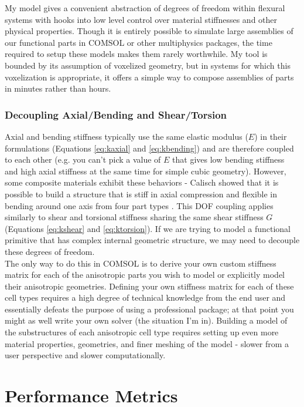 {My model gives a convenient abstraction of degrees of freedom within flexural systems with hooks into low level control over material stiffnesses and other physical properties.  Though it is entirely possible to simulate large assemblies of our functional parts in COMSOL or other multiphysics packages, the time required to setup these models makes them rarely worthwhile.  My tool is bounded by its assumption of voxelized geometry, but in systems for which this voxelization is appropriate, it offers a simple way to compose assemblies of parts in minutes rather than hours.  

\subsubsection{Decoupling Axial/Bending and Shear/Torsion}\label{sec:decoupling}

Axial and bending stiffness typically use the same elastic modulus ($E$) in their formulations (Equations \ref{eq:kaxial} and \ref{eq:kbending}) and are therefore coupled to each other (e.g. you can't pick a value of $E$ that gives low bending stiffness and high axial stiffness at the same time for simple cubic geometry).  However, some composite materials exhibit these behaviors - Calisch showed that it is possible to build a structure that is stiff in axial compression and flexible in bending around one axis from four part types \cite{Calisch2014}.  This DOF coupling applies similarly to shear and torsional stiffness sharing the same shear stiffness $G$ (Equations \ref{eq:kshear} and \ref{eq:ktorsion}).  If we are trying to model a functional primitive that has complex internal geometric structure, we may need to decouple these degrees of freedom.\\

The only way to do this in COMSOL is to derive your own custom stiffness matrix for each of the anisotropic parts you wish to model or explicitly model their anisotropic geometries.  Defining your own stiffness matrix for each of these cell types requires a high degree of technical knowledge from the end user and essentially defeats the purpose of using a professional package; at that point you might as well write your own solver (the situation I'm in).  Building a model of the substructures of each anisotropic cell type requires setting up even more material properties, geometries, and finer meshing of the model - slower from a user perspective and slower computationally.

\section{Performance Metrics}

}
